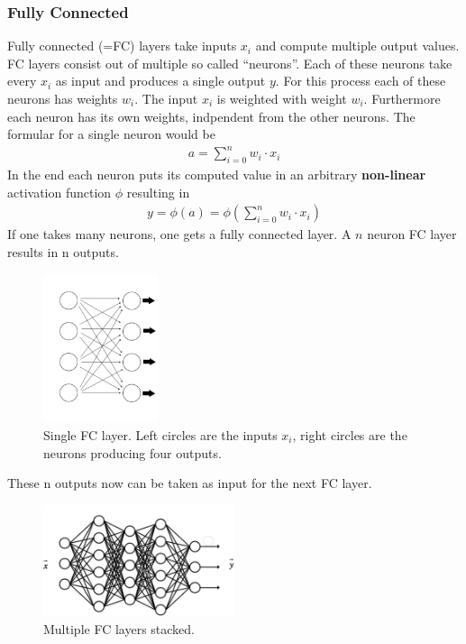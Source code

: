 \documentclass[
     11pt,         %
     a4paper,      %
     oneside,
     ]{article}
\begin{document}
\subsubsection{Fully Connected}
Fully connected (=FC) layers take inputs $x_i$ and compute multiple output values. FC layers consist out of multiple so called \enquote{neurons}. Each of these neurons take every $x_i$ as input and produces a single output $y$. For this process each of these neurons has weights $w_i$. The input $x_i$ is weighted with weight $w_i$. Furthermore each neuron has its own weights, indpendent from the other neurons.
The formular for a single neuron would be
\begin{align*}
  a = \sum^n_{i=0} w_i \cdot x_i
\end{align*}
In the end each neuron puts its computed value in an arbitrary \textbf{non-linear} activation function $\phi$ resulting in
\begin{align*}
  y = \phi (a) = \phi ( \sum^n_{i=0} w_i \cdot x_i )
\end{align*}
If one takes many neurons, one gets a fully connected layer. A $n$ neuron FC layer results in n outputs.
\begin{figure}[H]
  \begin{center}
    \includegraphics[width=0.3\textwidth]{images/fc-layer.png}
    \caption{Single FC layer. Left circles are the inputs $x_i$, right circles are the neurons producing four outputs.}
    \label{fig:fc-layer}
  \end{center}
\end{figure}

These n outputs now can be taken as input for the next FC layer.
\begin{figure}[H]
  \begin{center}
    \includegraphics[width=0.5\textwidth]{images/multipleFC.png}
    \caption{Multiple FC layers stacked.}
    \label{fig:multipleFC}
  \end{center}
\end{figure}
\end{document}
